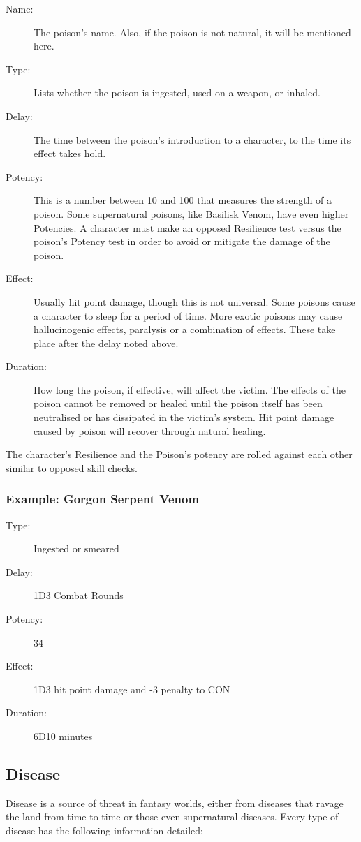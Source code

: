 \begin{description}
	\item[Name:] The poison’s name. Also, if the poison is not natural, it will be mentioned here. 
	\item[Type:] Lists whether the poison is ingested, used on a weapon, or inhaled. 
	\item[Delay:] The time between the poison’s introduction to a character, to the time its effect takes hold. 
	\item[Potency:] This is a number between 10 and 100 that measures the strength of a poison. Some supernatural poisons, like Basilisk Venom, have even higher Potencies. A character must make an opposed Resilience test versus the poison’s Potency test in order to avoid or mitigate the damage of the poison. 
	\item[Effect:] Usually hit point damage, though this is not universal. Some poisons cause a character to sleep for a period of time. More exotic poisons may cause hallucinogenic effects, paralysis or a combination of effects. These take place after the delay noted above. 
	\item[Duration:] How long the poison, if effective, will affect the victim. The effects of the poison cannot be removed or healed until the poison itself has been neutralised or has dissipated in the victim’s system. Hit point damage caused by poison will recover through natural healing. 
\end{description}

The character's Resilience and the Poison's potency are rolled against each other similar to opposed skill checks.

\subsubsection{Example: Gorgon Serpent Venom}

\begin{description}
\item[Type:] Ingested or smeared
\item[Delay:] 1D3 Combat Rounds
\item[Potency:] 34
\item[Effect:] 1D3 hit point damage and -3 penalty to CON
\item[Duration:] 6D10 minutes
\end{description}

\subsection{Disease}
Disease is a source of threat in fantasy worlds, either from diseases that ravage the land from time to time or those even supernatural diseases.
Every type of disease has the following information detailed: 

